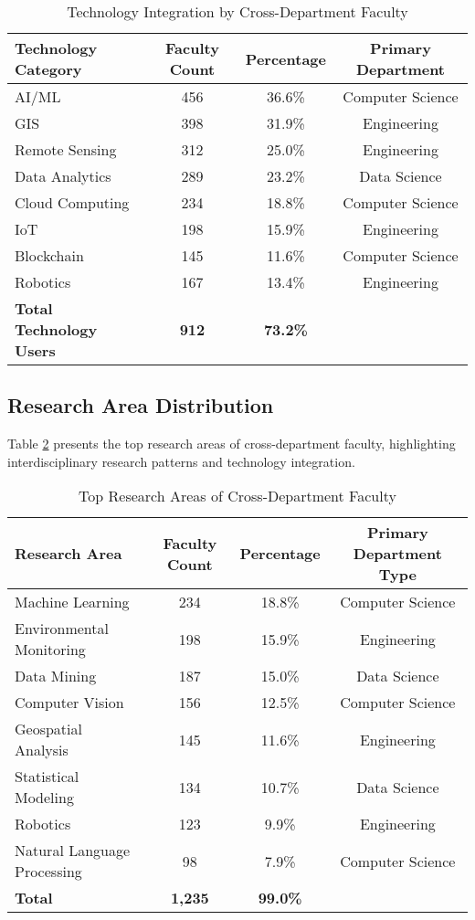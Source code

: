 \documentclass[12pt]{article}
\begin{document}
\begin{table}[h]
\centering
\caption{Technology Integration by Cross-Department Faculty}
\label{tab:technology_integration}
\begin{tabular}{lccc}
\toprule
\textbf{Technology Category} & \textbf{Faculty Count} & \textbf{Percentage} & \textbf{Primary Department} \\
\midrule
AI/ML & 456 & 36.6\% & Computer Science \\
GIS & 398 & 31.9\% & Engineering \\
Remote Sensing & 312 & 25.0\% & Engineering \\
Data Analytics & 289 & 23.2\% & Data Science \\
Cloud Computing & 234 & 18.8\% & Computer Science \\
IoT & 198 & 15.9\% & Engineering \\
Blockchain & 145 & 11.6\% & Computer Science \\
Robotics & 167 & 13.4\% & Engineering \\
\midrule
\textbf{Total Technology Users} & \textbf{912} & \textbf{73.2\%} & \\
\bottomrule
\end{tabular}
\end{table}

\subsection{Research Area Distribution}

Table \ref{tab:research_areas} presents the top research areas of cross-department faculty, highlighting interdisciplinary research patterns and technology integration.

\begin{table}[h]
\centering
\caption{Top Research Areas of Cross-Department Faculty}
\label{tab:research_areas}
\begin{tabular}{lccc}
\toprule
\textbf{Research Area} & \textbf{Faculty Count} & \textbf{Percentage} & \textbf{Primary Department Type} \\
\midrule
Machine Learning & 234 & 18.8\% & Computer Science \\
Environmental Monitoring & 198 & 15.9\% & Engineering \\
Data Mining & 187 & 15.0\% & Data Science \\
Computer Vision & 156 & 12.5\% & Computer Science \\
Geospatial Analysis & 145 & 11.6\% & Engineering \\
Statistical Modeling & 134 & 10.7\% & Data Science \\
Robotics & 123 & 9.9\% & Engineering \\
Natural Language Processing & 98 & 7.9\% & Computer Science \\
\midrule
\textbf{Total} & \textbf{1,235} & \textbf{99.0\%} & \\
\bottomrule
\end{tabular}
\end{table}
\end{document}

